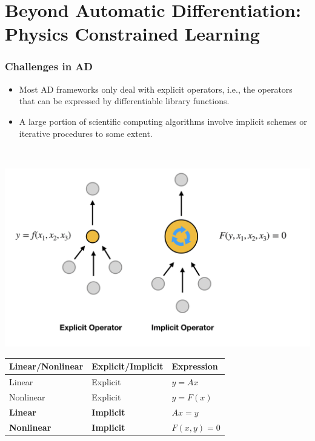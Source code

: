 \documentclass{beamer}
\begin{document}
\section{Beyond Automatic Differentiation: Physics Constrained Learning}
\begin{frame}


	\frametitle{Challenges in AD}
	
	
	\begin{minipage}[t]{0.49\textwidth}
	\vspace{-3cm}
\begin{itemize}
	\item Most AD frameworks only deal with explicit operators, i.e., the operators that can be expressed by differentiable library functions. 
	\item A large portion of scientific computing algorithms involve implicit schemes or iterative procedures to some extent.
\end{itemize}
\end{minipage}~
\begin{minipage}[t]{0.49\textwidth}
  \includegraphics[width=1.0\textwidth]{../sim.png}
\end{minipage}

\begin{table}[]
\begin{tabular}{@{}lll@{}}
\toprule
Linear/Nonlinear & Explicit/Implicit & Expression   \\ \midrule
Linear           & Explicit          & $y=Ax$       \\
Nonlinear        & Explicit          & $y = F(x)$   \\
\textbf{Linear}           & \textbf{Implicit}          & $Ax = y$     \\
\textbf{Nonlinear}        & \textbf{Implicit}          & $F(x,y) = 0$ \\ \bottomrule
\end{tabular}
\end{table}
\end{frame}
\end{document}
